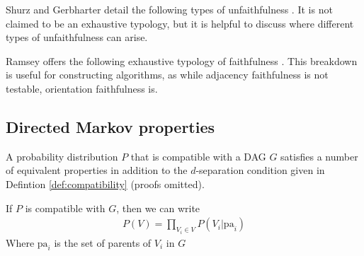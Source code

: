 Shurz and Gerbharter detail the following types of unfaithfulness \cite{schurz_causality_2016}. It is not claimed to be an exhaustive typology, but it is helpful to discuss where different types of unfaithfulness can arise.

\begin{definition}

\end{definition}

\begin{definition}

\end{definition}

\begin{definition}\label{def:intrans_unfaith}

\end{definition}

Ramsey offers the following exhaustive typology of faithfulness \cite{ramsey_adjacency-faithfulness_2012}. This breakdown is useful for constructing algorithms, as while adjacency faithfulness is not testable, orientation faithfulness is.

\begin{definition}

\end{definition}

\begin{definition}

\end{definition}

\subsection{Directed Markov properties}

A probability distribution $P$ that is compatible with a DAG $G$ satisfies a number of equivalent properties in addition to the $d$-separation condition given in Defintion \ref{def:compatibility} (proofs omitted).

\begin{definition}\label{def:markov_factorisation}
If $P$ is compatible with $G$, then we can write
\begin{align}
    P(V) = \prod_{V_i\in V} P(V_i|\mathrm{pa}_i)
\end{align}
Where $\mathrm{pa}_i$ is the set of parents of $V_i$ in $G$
\end{definition}

